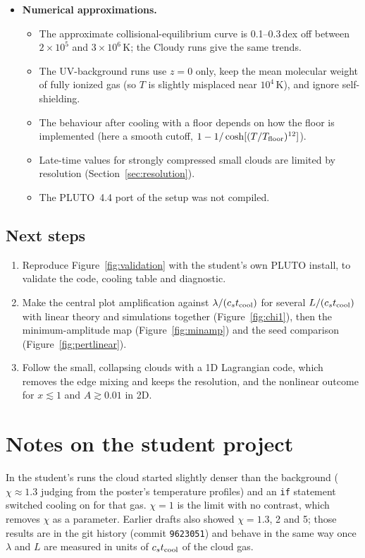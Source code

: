 \documentclass[11pt]{article}
\newcommand{\cstc}{c_s t_{\rm cool}}
\newcommand{\Tfl}{T_{\rm floor}}
\begin{document}
\begin{itemize}
\item \textbf{Numerical approximations.}
  \begin{itemize}
  \item The approximate collisional-equilibrium curve is 0.1--0.3\,dex off between
    $2\times10^5$ and $3\times10^6$\,K; the Cloudy runs give the same trends.
  \item The UV-background runs use $z=0$ only, keep the mean molecular weight of
    fully ionized gas (so $T$ is slightly misplaced near $10^4$\,K), and ignore
    self-shielding.
  \item The behaviour after cooling with a floor depends on how the floor is
    implemented (here a smooth cutoff, $1-1/\cosh[(T/\Tfl)^{12}]$).
  \item Late-time values for strongly compressed small clouds are limited by
    resolution (Section~\ref{sec:resolution}).
  \item The PLUTO~4.4 port of the setup was not compiled.
  \end{itemize}
\end{itemize}

\subsection{Next steps}
\begin{enumerate}
\item Reproduce Figure~\ref{fig:validation} with the student's own PLUTO install,
  to validate the code, cooling table and diagnostic.
\item Make the central plot amplification against $\lambda/(\cstc)$ for several
  $L/(\cstc)$ with linear theory and simulations together (Figure~\ref{fig:chi1}),
  then the minimum-amplitude map (Figure~\ref{fig:minamp}) and the seed comparison
  (Figure~\ref{fig:pertlinear}).
\item Follow the small, collapsing clouds with a 1D Lagrangian code, which removes
  the edge mixing and keeps the resolution, and the nonlinear outcome for
  $x\lesssim1$ and $A\gtrsim0.01$ in 2D.
\end{enumerate}

\appendix
\section{Notes on the student project}
\label{sec:critique}
In the student's runs the cloud
started slightly denser than the background ($\chi\approx1.3$ judging from the
poster's temperature profiles) and an \texttt{if} statement switched cooling on
for that gas. $\chi=1$ is the limit with no contrast, which removes $\chi$ as a
parameter. Earlier drafts also showed $\chi=1.3$, 2 and 5; those results are
in the git history (commit \texttt{9623051}) and behave in the same way once
$\lambda$ and $L$ are measured in units of $\cstc$ of the cloud gas.
\end{document}

